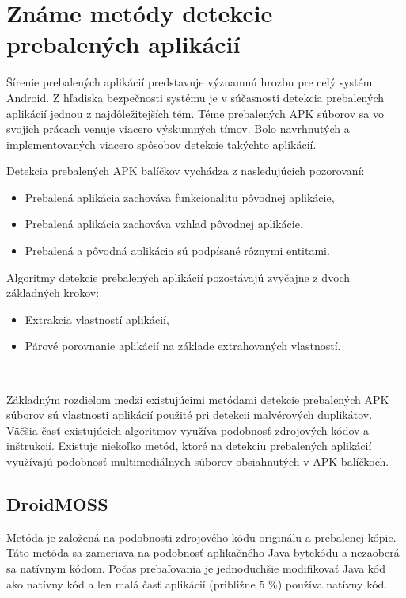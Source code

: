 \chapter{Známe metódy detekcie prebalených aplikácií}
\label{chap:zname-metody}
Šírenie prebalených aplikácií predstavuje významnú hrozbu pre celý systém Android. Z hľadiska bezpečnosti systému je v súčasnosti detekcia prebalených aplikácií jednou z najdôležitejších tém.
Téme prebalených APK súborov sa vo svojich prácach venuje viacero výskumných tímov. Bolo navrhnutých a implementovaných viacero spôsobov detekcie takýchto aplikácií. 
\newline 

\noindent Detekcia prebalených APK balíčkov vychádza z nasledujúcich pozorovaní:
\begin{itemize}
	\item Prebalená aplikácia zachováva funkcionalitu pôvodnej aplikácie,
	\item Prebalená aplikácia zachováva vzhľad pôvodnej aplikácie,
	\item Prebalená a pôvodná aplikácia sú podpísané rôznymi entitami.
\end{itemize} 

\noindent Algoritmy detekcie prebalených aplikácií pozostávajú zvyčajne z dvoch základných krokov:
\begin{itemize}
	\item Extrakcia vlastností aplikácií,
	\item Párové porovnanie aplikácií na základe extrahovaných vlastností.
\end{itemize}
\ \newline

\noindent Základným rozdielom medzi existujúcimi metódami detekcie prebalených APK súborov sú vlastnosti aplikácií použité pri detekcii malvérových duplikátov. Väčšia časť existujúcich algoritmov využíva podobnosť zdrojových kódov a inštrukcií. Existuje niekoľko metód, ktoré na detekciu prebalených aplikácií využívajú podobnosť multimediálnych súborov obsiahnutých v APK balíčkoch.

\section{DroidMOSS}
Metóda  je založená na podobnosti zdrojového kódu originálu a prebalenej kópie. Táto metóda sa zameriava na podobnosť aplikačného Java bytekódu a nezaoberá sa natívnym kódom. Počas prebaľovania je jednoduchšie modifikovať Java kód ako natívny kód a len malá časť aplikácií (približne 5 \%) používa natívny kód.

